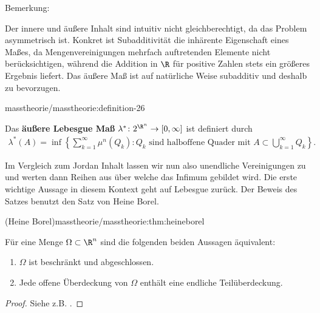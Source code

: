 \documentclass[letterpaper,10pt,german]{jupyterBook}
\begin{document}
\begin{emphBox}{}{}{Bemerkung:}
\par
Der innere und äußere Inhalt sind intuitiv nicht gleichberechtigt, da das Problem asymmetrisch ist. Konkret ist Subadditivität die inhärente Eigenschaft eines Maßes, da Mengenvereinigungen mehrfach auftretenden Elemente nicht berücksichtigen, während die Addition in \(\R\) für positive Zahlen stets ein größeres Ergebnis liefert. Das äußere Maß ist auf natürliche Weise subadditiv und deshalb zu bevorzugen.
\end{emphBox}
\begin{definition}{}{masstheorie/masstheorie:definition-26}



\par
Das \textbf{äußere Lebesgue Maß} \(\lambda^* \colon 2^{\R^n} \rightarrow [0,\infty]\) ist definiert durch
\begin{align*}
\lambda^*(A) = \inf \left\{ \sum_{k=1}^\infty \mu^n(Q_k) : Q_k \text{ sind halboffene Quader mit } A \subset \bigcup_{k=1}^\infty Q_k \right\}.
\end{align*}\end{definition}

\par
Im Vergleich zum Jordan Inhalt lassen wir nun also unendliche Vereinigungen zu und werten dann Reihen aus über welche das Infimum gebildet wird. Die erste wichtige Aussage in diesem Kontext geht auf Lebesgue zurück. Der Beweis des Satzes benutzt den Satz von Heine Borel.
\begin{theorem}{(Heine Borel)}{masstheorie/masstheorie:thm:heineborel}



\par
Für eine Menge \(\Omega\subset\R^n\) sind die folgenden beiden Aussagen äquivalent:
\begin{enumerate}

\item {} 
\par
\(\Omega\) ist beschränkt und abgeschlossen.

\item {} 
\par
Jede offene Überdeckung von \(\Omega\) enthält eine endliche Teilüberdeckung.

\end{enumerate}
\end{theorem}

\begin{proof}
 Siehe z.B. \cite{For17}.
\end{proof}
\end{document}
